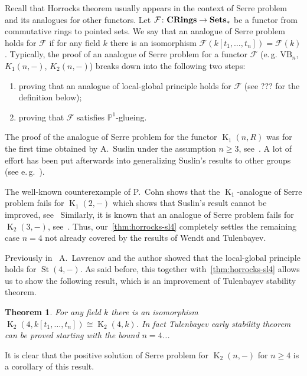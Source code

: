 \documentclass[oneside, 10pt]{amsart}
\DeclareMathOperator{\St}{St}
\DeclareMathOperator{\K}{K}
\newcommand{\catname}[1]{{\normalfont\textbf{#1}}}
\newtheorem{thm}{Theorem}
\numberwithin{equation}{section}
\numberwithin{lemma}{section}
\theoremstyle{definition}
\theoremstyle{remark}
\begin{document}
Recall that Horrocks theorem usually appears in the context of Serre problem and its analogues for other functors.
Let $\mathcal{F}\colon \catname{CRings} \to \catname{Sets}_*$ be a functor from commutative rings to pointed sets. 
We say that an analogue of Serre problem holds for $\mathcal{F}$ if for any field $k$ there is an isomorphism $\mathcal{F}(k[t_1, \ldots, t_n]) = \mathcal{F}(k)$. 
Typically, the proof of an analogue of Serre problem for a functor $\mathcal{F}$ (e.\,g. $\mathrm{VB}_n$, $K_1(n, -)$, $K_2(n, -)$) 
 breaks down into the following two steps: 
\begin{enumerate}
 \item proving that an analogue of local-global principle holds for $\mathcal{F}$ (see ??? for the definition below);
 \item proving that $\mathcal{F}$ satisfies $\mathbb{P}^1$-glueing.
\end{enumerate}

The proof of the analogue of Serre problem for the functor $\K_1(n, R)$ was for the first time obtained by A.~Suslin under the assumption $n\geq 3$, see~\cite{Su77}.
A lot of effort has been put afterwards into generalizing Suslin's results to other groups (see e.\,g.~\cite{Abe83, St-poly}).
\begin{comment}
One of the more recent results in this direction is~\cite[Theorem~1.1]{St-poly} due to A.~Stavrova, 
 in which $\mathbb{P}^1$-glueing property is proved for functors $\K_1^G$ modeled on a large class of isotropic reductive groups 
  (consisting, roughly speaking, of groups having local isotropic rank at least $2$). %
\end{comment}
 
The well-known counterexample of P.~Cohn shows that the $\K_1$-analogue of Serre problem fails for $\K_1(2, -)$ which shows that Suslin's result cannot be improved, see~\cite[\S~I.8]{Lam10}
Similarly, it is known that an analogue of Serre problem fails for $\K_2(3, -)$, see~\cite{We14}.
Thus, our~\cref{thm:horrocks-sl4} completely settles the remaining case $n=4$ not already covered by the results of Wendt and Tulenbayev.

Previously in~\cite{LS17} A.~Lavrenov and the author showed that the local-global principle holds for $\St(4, -)$.
As said before, this together with~\cref{thm:horrocks-sl4} allows us to show the following result, which is an improvement of Tulenbayev stability theorem.
\begin{thm} \label{thm:Serre-problem} %
  For any field $k$ there is an isomorphism $\K_2(4, k[t_1, \ldots, t_n]) \cong \K_2(4, k)$.
  In fact Tulenbayev early stability theorem can be proved starting with the bound $n=4$... 
\end{thm}
It is clear that the positive solution of Serre problem for $\K_2(n, -)$ for $n\geq 4$ is a corollary of this result.
\end{document}
